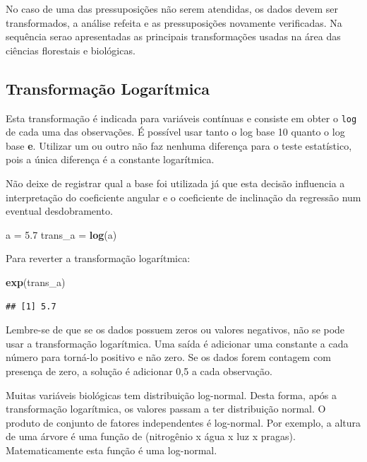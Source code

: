 \documentclass[
]{article}
\newenvironment{Shaded}{\begin{snugshade}}{\end{snugshade}}
\newcommand{\FloatTok}[1]{\textcolor[rgb]{0.00,0.00,0.81}{#1}}
\newcommand{\KeywordTok}[1]{\textcolor[rgb]{0.13,0.29,0.53}{\textbf{#1}}}
\newcommand{\NormalTok}[1]{#1}
\newcommand{\StringTok}[1]{\textcolor[rgb]{0.31,0.60,0.02}{#1}}
\begin{document}
No caso de uma das pressuposições não serem atendidas, os dados devem ser transformados, a análise refeita e as pressuposições novamente verificadas. Na sequência serao apresentadas as principais transformações usadas na área das ciências florestais e biológicas.

\hypertarget{transformauxe7uxe3o-logaruxedtmica}{%
\subsection{Transformação Logarítmica}\label{transformauxe7uxe3o-logaruxedtmica}}

Esta transformação é indicada para variáveis contínuas e consiste em obter o \texttt{log} de cada uma das observações. É possível usar tanto o log base 10 quanto o log base \textbf{e}. Utilizar um ou outro não faz nenhuma diferença para o teste estatístico, pois a única diferença é a constante logarítmica.

Não deixe de registrar qual a base foi utilizada já que esta decisão influencia a interpretação do coeficiente angular e o coeficiente de inclinação da regressão num eventual desdobramento.

\begin{Shaded}
\begin{Highlighting}[]
\NormalTok{a =}\StringTok{ }\FloatTok{5.7}
\NormalTok{trans_a =}\StringTok{ }\KeywordTok{log}\NormalTok{(a)}
\end{Highlighting}
\end{Shaded}

Para reverter a transformação logarítmica:

\begin{Shaded}
\begin{Highlighting}[]
\KeywordTok{exp}\NormalTok{(trans_a)}
\end{Highlighting}
\end{Shaded}

\begin{verbatim}
## [1] 5.7
\end{verbatim}

Lembre-se de que se os dados possuem zeros ou valores negativos, não se pode usar a transformação logarítmica. Uma saída é adicionar uma constante a cada número para torná-lo positivo e não zero. Se os dados forem contagem com presença de zero, a solução é adicionar 0,5 a cada observação.

Muitas variáveis biológicas tem distribuição log-normal. Desta forma, após a transformação logarítmica, os valores passam a ter distribuição normal. O produto de conjunto de fatores independentes é log-normal. Por exemplo, a altura de uma árvore é uma função de (nitrogênio x água x luz x pragas). Matematicamente esta função é uma log-normal.
\end{document}
